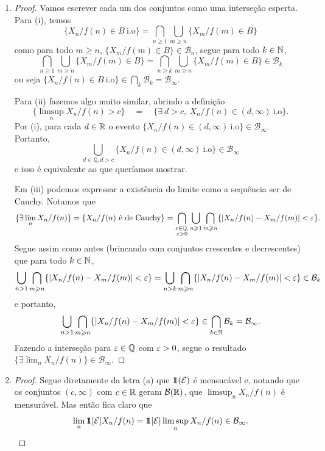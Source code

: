 \begin{enumerate}[label=(\alph*)]
	\item
		\begin{proof}
			Vamos escrever cada um dos conjuntos como uma interseção esperta.
			Para (i), temos
			\[
				\{X_n/f(n) \in B \ \text{i.o}\} = \bigcap_{n \geq 1} \bigcup_{m
				\geq n} \{X_m/f(m) \in B\}
			\]
			como para todo $m \geq n$, $\{X_m/f(m) \in B\} \in \mathcal{B}_n$,
			segue para todo $k \in \mathbb{N}$,
			\[
				\bigcap_{n \geq 1} \bigcup_{m \geq n} \{X_m/f(m) \in B\} =
				\bigcap_{n \geq k} \bigcup_{m \geq n} \{X_m/f(m) \in B\} \in \mathcal{B}_k
			\]
			ou seja $\{X_n/f(n) \in B \ \text{i.o}\} \in \bigcap_k
			\mathcal{B}_k = \mathcal{B}_\infty$.

			Para (ii) fazemos algo muito similar,
			abrindo a definição
			\[
				\{\limsup_n X_n/f(n) > c\} \quad = \quad \{\exists\ d > c,
				\ X_n/f(n) \in (d,\infty) \ \text{i.o}\}.
			\]
			Por (i), para cada $d \in \mathbb{R}$ o evento $\{X_n/f(n) \in (d,\infty)
			\ \text{i.o}\} \in \mathcal{B}_\infty$. Portanto,
			\[
				\bigcup_{d \in \mathbb{Q}, d > c} \{X_n/f(n) \in (d,\infty)
				\ \text{i.o}\} \in \mathcal{B}_\infty
			\]
			e isso é equivalente ao que queríamos mostrar.

			Em (iii) podemos expressar a existência do limite como a sequência
			ser de Cauchy. Notamos que
			\[
				\{\exists \lim_n X_n/f(n)\} = \{X_n/f(n) \ \text{é de Cauchy}\} =
				\bigcap_{\substack{\varepsilon \in \mathbb{Q},\\ \varepsilon > 0}} \bigcup_{n
				\geqslant 1} \bigcap_{m \geqslant n} \{|X_n/f(n) - X_m/f(m)| < \varepsilon\}.
			\]			
			Segue assim como antes (brincando com conjuntos crescentes e
			decrescentes) que para todo $k \in \mathbb{N}$,
			\[
				\bigcup_{n > 1} \bigcap_{m \geqslant n} \{|X_n/f(n) - X_m/f(m)| <
				\varepsilon\} = \bigcup_{n > k} \bigcap_{m \geqslant n} \{|X_n/f(n) -
				X_m/f(m)| < \varepsilon\} \in \mathcal{B}_k
			\]
			e portanto,
			\[
				\bigcup_{n > 1}\bigcap_{m \geqslant n} \{|X_n/f(n) - X_m/f(m)| <
				\varepsilon\} \in \bigcap_{k \in \mathbb{N}} \mathcal{B}_k = \mathcal{B}_\infty.
			\]
			Fazendo a interseção para $\varepsilon \in \mathbb{Q}$ com $\varepsilon > 0$,
			segue o resultado $\{\exists \lim_n X_n/f(n)\} \in \mathcal{B}_\infty$.
		\end{proof}

	\item
		\begin{proof}
			Segue diretamente da letra (a) que $\hbox{$1\mkern-6.5mu1$}(\mathcal{E})$ é mensurável
			e, notando que os conjuntos $(c,\infty)$ com $c \in \mathbb{R}$ geram
			$\mathcal{B}(\mathbb{R})$, que
			$\limsup_n X_n/f(n)$ é mensurável. Mas então fica claro que
			\[
				\lim_n \hbox{$1\mkern-6.5mu1$}[\mathcal{E}]X_n/f(n) = \hbox{$1\mkern-6.5mu1$}[\mathcal{E}] \limsup_n
				X_n/f(n) \in \mathcal{B}_\infty.
			\]
		\end{proof}
\end{enumerate}

